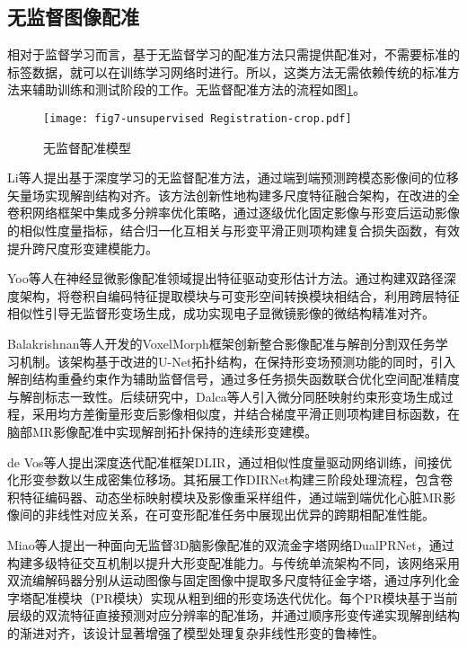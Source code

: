 \subsection{无监督图像配准}

相对于监督学习而言，基于无监督学习的配准方法只需提供配准对，不需要标准的标签数据，就可以在训练学习网络时进行。所以，这类方法无需依赖传统的标准方法来辅助训练和测试阶段的工作。无监督配准方法的流程如图\ref{fig:7}。

\begin{figure}[h]
    \centering
    \texttt{[image: fig7-unsupervised Registration-crop.pdf]}
    \caption{无监督配准模型}
    \label{fig:7}
\end{figure}


Li等人提出基于深度学习的无监督配准方法，通过端到端预测跨模态影像间的位移矢量场实现解剖结构对齐。该方法创新性地构建多尺度特征融合架构，在改进的全卷积网络框架中集成多分辨率优化策略，通过逐级优化固定影像与形变后运动影像的相似性度量指标，结合归一化互相关与形变平滑正则项构建复合损失函数，有效提升跨尺度形变建模能力\cite{long2015fully}。

Yoo等人在神经显微影像配准领域提出特征驱动变形估计方法。通过构建双路径深度架构，将卷积自编码特征提取模块与可变形空间转换模块相结合，利用跨层特征相似性引导无监督形变场生成，成功实现电子显微镜影像的微结构精准对齐\cite{avants2008symmetric}。

Balakrishnan等人开发的VoxelMorph框架创新整合影像配准与解剖分割双任务学习机制。该架构基于改进的U-Net拓扑结构，在保持形变场预测功能的同时，引入解剖结构重叠约束作为辅助监督信号，通过多任务损失函数联合优化空间配准精度与解剖标志一致性\cite{balakrishnan2018unsupervised,balakrishnan2019voxelmorph}。后续研究中，Dalca等人引入微分同胚映射约束形变场生成过程，采用均方差衡量形变后影像相似度，并结合梯度平滑正则项构建目标函数，在脑部MR影像配准中实现解剖拓扑保持的连续形变建模。

de Vos等人提出深度迭代配准框架DLIR，通过相似性度量驱动网络训练，间接优化形变参数以生成密集位移场\cite{de2019deep}。其拓展工作DIRNet构建三阶段处理流程，包含卷积特征编码器、动态坐标映射模块及影像重采样组件，通过端到端优化心脏MR影像间的非线性对应关系，在可变形配准任务中展现出优异的跨期相配准性能\cite{de2017end}。

Miao\cite{kang2022dual}等人提出一种面向无监督3D脑影像配准的双流金字塔网络DualPRNet，通过构建多级特征交互机制以提升大形变配准能力。与传统单流架构不同，该网络采用双流编解码器分别从运动图像与固定图像中提取多尺度特征金字塔，通过序列化金字塔配准模块（PR模块）实现从粗到细的形变场迭代优化。每个PR模块基于当前层级的双流特征直接预测对应分辨率的配准场，并通过顺序形变传递实现解剖结构的渐进对齐，该设计显著增强了模型处理复杂非线性形变的鲁棒性。

